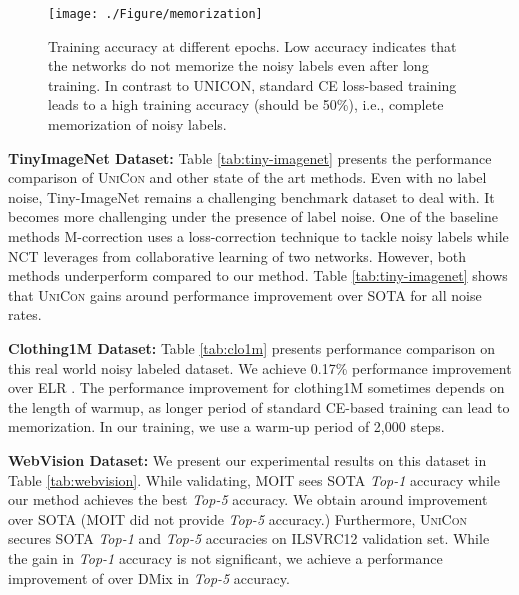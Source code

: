 \documentclass[10pt,twocolumn,letterpaper]{article}
\begin{document}
\begin{figure}
    \centering
    \texttt{[image: ./Figure/memorization]}
    \vspace{-2mm}
    \caption{Training accuracy at different epochs. Low accuracy indicates that the networks do not memorize the noisy labels even after long training. In contrast to UNICON, standard CE loss-based training leads to a high training accuracy (should be 50\%), i.e., complete memorization of noisy labels.}
    \label{fig:memorization}
    \vspace{-2mm}
\end{figure}
\textbf{TinyImageNet Dataset:} Table \ref{tab:tiny-imagenet} presents the performance comparison of \textsc{UniCon} and other state of the art methods. 
Even with no label noise, Tiny-ImageNet remains a challenging benchmark dataset to deal with. It becomes more challenging under the presence of label noise. One of the baseline methods M-correction \cite{arazo2019unsupervised} uses a loss-correction technique to tackle noisy labels while NCT \cite{sarfraz2020noisy} leverages from collaborative learning of two networks. However, both methods underperform compared to our method. Table \ref{tab:tiny-imagenet} shows that \textsc{UniCon} gains around  performance improvement over SOTA for all noise rates. 


 \textbf{Clothing1M Dataset:} 
Table \ref{tab:clo1m} presents performance comparison on this real world noisy labeled dataset. 
We achieve 0.17\% performance improvement over ELR \cite{liu2020earlylearning}. The performance improvement for clothing1M sometimes depends on the length of warmup, as longer period of standard CE-based training can lead to memorization. In our training, we use a warm-up period of 2,000 steps.  

\textbf{WebVision Dataset:} We present our experimental results on this dataset in Table \ref{tab:webvision}. While validating, MOIT \cite{ortego2021multiobjective} sees SOTA \emph{Top-1} accuracy while our method achieves the best  \emph{Top-5} accuracy. We obtain around  improvement over SOTA (MOIT \cite{ortego2021multiobjective} did not provide \emph{Top-5} accuracy.)  Furthermore, \textsc{UniCon} secures SOTA \emph{Top-1} and \emph{Top-5} accuracies on ILSVRC12 validation set. While the gain in \emph{Top-1} accuracy is not significant, we achieve a performance improvement of  over DMix \cite{li2020dividemix} in \emph{Top-5} accuracy. 
\end{document}

